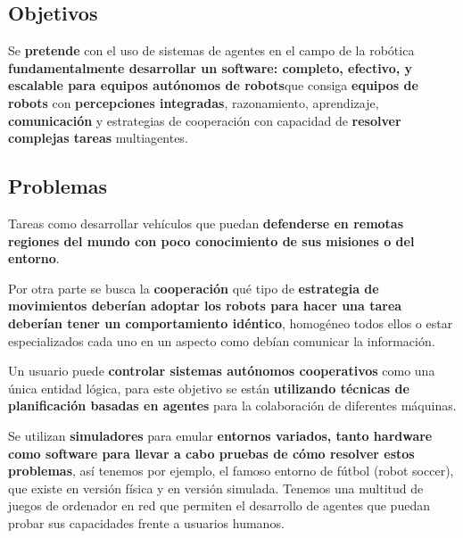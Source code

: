 \documentclass[12pt, twoside, openright]{report} %
\begin{document}
\subsection{Objetivos}
Se \textbf{pretende} con el uso de sistemas de agentes en el campo de la robótica \textbf{fundamentalmente desarrollar un software: completo, efectivo, y escalable para equipos autónomos de robots}que consiga \textbf{equipos de robots} con \textbf{percepciones integradas}, razonamiento, aprendizaje, \textbf{comunicación} y estrategias de cooperación con capacidad de \textbf{resolver complejas tareas} multiagentes.

\subsection{Problemas}
Tareas como desarrollar vehículos que puedan \textbf{defenderse en remotas regiones del mundo con poco conocimiento de sus misiones o del entorno}.

Por otra parte se busca la \textbf{cooperación} qué tipo de \textbf{estrategia de movimientos deberían adoptar los robots para hacer una tarea deberían tener un comportamiento idéntico}, homogéneo todos ellos o estar especializados cada uno en un aspecto como debían comunicar la información.

Un usuario puede \textbf{controlar sistemas autónomos cooperativos} como una única entidad lógica, para este objetivo se están \textbf{utilizando técnicas de planificación basadas en agentes} para la colaboración de diferentes máquinas.

Se utilizan \textbf{simuladores} para emular \textbf{entornos variados, tanto hardware como software para llevar a cabo pruebas de cómo resolver estos problemas}, así tenemos por ejemplo, el famoso entorno de fútbol (robot soccer), que existe en versión física y en versión simulada. Tenemos una multitud de juegos de ordenador en red que permiten el desarrollo de agentes que puedan probar sus capacidades frente a usuarios humanos.
\end{document}
